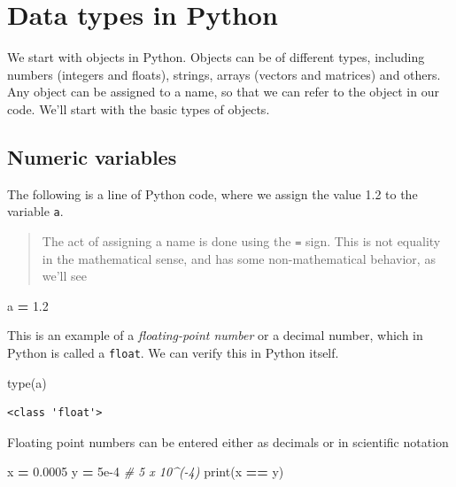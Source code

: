 \documentclass[
  letterpaper,
]{scrbook}
\newenvironment{Shaded}{\begin{snugshade}}{\end{snugshade}}
\newcommand{\BuiltInTok}[1]{#1}
\newcommand{\CommentTok}[1]{\textcolor[rgb]{0.56,0.35,0.01}{\textit{#1}}}
\newcommand{\FloatTok}[1]{\textcolor[rgb]{0.00,0.00,0.81}{#1}}
\newcommand{\NormalTok}[1]{#1}
\newcommand{\OperatorTok}[1]{\textcolor[rgb]{0.81,0.36,0.00}{\textbf{#1}}}
\begin{document}
\hypertarget{data-types-in-python}{%
\section{Data types in Python}\label{data-types-in-python}}

We start with objects in Python. Objects can be of different types, including numbers (integers and floats), strings, arrays (vectors and matrices) and others. Any object can be assigned to a name, so that we can refer to the object in our code. We'll start with the basic types of objects.

\hypertarget{numeric-variables}{%
\subsection{Numeric variables}\label{numeric-variables}}

The following is a line of Python code, where we assign the value 1.2 to the variable \texttt{a}.

\begin{quote}
The act of assigning a name is done using the \texttt{=} sign. This is not equality in the mathematical sense, and has some non-mathematical behavior, as we'll see
\end{quote}

\begin{Shaded}
\begin{Highlighting}[]
\NormalTok{a }\OperatorTok{=} \FloatTok{1.2}
\end{Highlighting}
\end{Shaded}

This is an example of a \emph{floating-point number} or a decimal number, which in Python is called a \texttt{float}. We can verify this in Python itself.

\begin{Shaded}
\begin{Highlighting}[]
\BuiltInTok{type}\NormalTok{(a)}
\end{Highlighting}
\end{Shaded}

\begin{verbatim}
<class 'float'>
\end{verbatim}

Floating point numbers can be entered either as decimals or in scientific notation

\begin{Shaded}
\begin{Highlighting}[]
\NormalTok{x }\OperatorTok{=} \FloatTok{0.0005}
\NormalTok{y }\OperatorTok{=} \FloatTok{5e-4} \CommentTok{# 5 x 10^(-4)}
\BuiltInTok{print}\NormalTok{(x }\OperatorTok{==}\NormalTok{ y)}
\end{Highlighting}
\end{Shaded}
\end{document}
